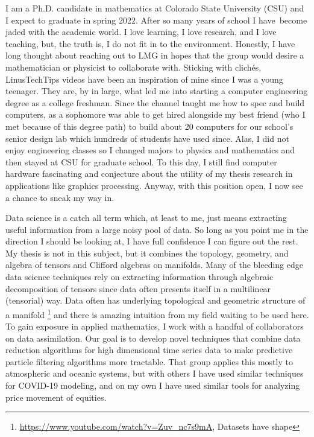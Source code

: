 \documentclass[11pt, a4paper]{awesome-cv}
\begin{document}
\makecvheader
\makelettertitle
\begin{cvletter}


I am a Ph.D. candidate in mathematics at Colorado State University (CSU) and I expect to graduate in spring 2022. After so many years of school I have become jaded with the academic world. I love learning, I love research, and I love teaching, but, the truth is, I do not fit in to the environment. Honestly, I have long thought about reaching out to LMG in hopes that the group would desire a mathematician or physicist to collaborate with. Sticking with clich\'es, LinusTechTips videos have been an inspiration of mine since I was a young teenager. They are, by in large, what led me into starting a computer engineering degree as a college freshman. Since the channel taught me how to spec and build computers, as a sophomore was able to get hired alongside my best friend (who I met because of this degree path) to build about 20 computers for our school's senior design lab which hundreds of students have used since. Alas, I did not enjoy engineering classes so I changed majors to physics and mathematics and then stayed at CSU for graduate school. To this day, I still find computer hardware fascinating and conjecture about the utility of my thesis research in applications like graphics processing. Anyway, with this position open, I now see a chance to sneak my way in.

Data science is a catch all term which, at least to me, just means extracting useful information from a large noisy pool of data. So long as you point me in the direction I should be looking at, I have full confidence I can figure out the rest. My thesis is not in this subject, but it combines the topology, geometry, and algebra of tensors and Clifford algebras on manifolds. Many of the bleeding edge data science techniques rely on extracting information through algebraic decomposition of tensors since data often presents itself in a multilinear (tensorial) way. Data often has underlying topological and geometric structure of a manifold \footnote{\url{https://www.youtube.com/watch?v=Zuv_nc7s9mA}, Datasets have shape} and there is amazing intuition from my field waiting to be used here. To gain exposure in applied mathematics, I work with a handful of collaborators on data assimilation. Our goal is to develop novel techniques that combine data reduction algorithms for high dimensional time series data to make predictive particle filtering algorithms more tractable. That group applies this mostly to atmospheric and oceanic systems, but with others I have used similar techniques for COVID-19 modeling, and on my own I have used similar tools for analyzing price movement of equities.


\end{cvletter}
\end{document}
